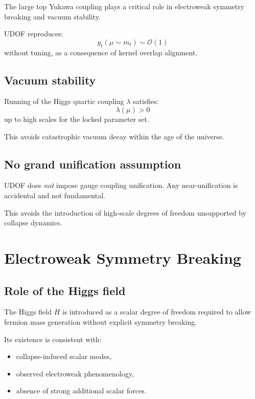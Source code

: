 \documentclass[11pt]{book}
\begin{document}
The large top Yukawa coupling plays a critical role in electroweak symmetry
breaking and vacuum stability.

UDOF reproduces:
\begin{equation}
y_t(\mu \sim m_t) \sim \mathcal{O}(1)
\end{equation}
without tuning, as a consequence of kernel overlap alignment.

\section{Vacuum stability}

Running of the Higgs quartic coupling $\lambda$ satisfies:
\begin{equation}
\lambda(\mu) > 0
\end{equation}
up to high scales for the locked parameter set.

This avoids catastrophic vacuum decay within the age of the universe.

\section{No grand unification assumption}

UDOF does \emph{not} impose gauge coupling unification.
Any near-unification is accidental and not fundamental.

This avoids the introduction of high-scale degrees of freedom unsupported
by collapse dynamics.

\chapter{Electroweak Symmetry Breaking}

\section{Role of the Higgs field}

The Higgs field $H$ is introduced as a scalar degree of freedom required
to allow fermion mass generation without explicit symmetry breaking.

Its existence is consistent with:
\begin{itemize}
\item collapse-induced scalar modes,
\item observed electroweak phenomenology,
\item absence of strong additional scalar forces.
\end{itemize}
\end{document}
